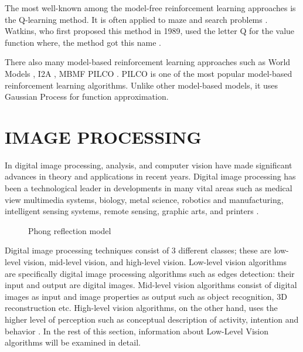 The most well-known among the model-free reinforcement learning approaches is the Q-learning method. It is often applied to maze and search problems \cite{tijsma2016comparing, guo2004new, whitehead1991complexity}. Watkins, who first proposed this method in 1989, used the letter Q for the value function where, the method got this name \cite{watkins1989learning}.

There also many model-based reinforcement learning approaches such as World Models \cite{ha2018world}, I2A \cite{racaniere2017imagination}, MBMF \cite{bansal2017mbmf} PILCO \cite{deisenroth2011pilco}. PILCO is one of the most popular model-based reinforcement learning algorithms. Unlike other model-based models, it uses Gaussian Process for function approximation.

\section{IMAGE PROCESSING}

In digital image processing, analysis, and computer vision have made significant advances in theory and applications in recent years. Digital image processing has been a technological leader in developments in many vital areas such as medical view multimedia systems, biology, metal science, robotics and manufacturing, intelligent sensing systems, remote sensing, graphic arts, and printers \cite{pitas2000digital}.

\begin{figure}[htbp]
\centering
{}
\caption{Phong reflection model \cite{kurihara2012shading}}
\label{fig:PhongReflectionModel}
\end{figure}


Digital image processing techniques consist of 3 different classes; these are low-level vision, mid-level vision, and high-level vision. Low-level vision algorithms are specifically digital image processing algorithms such as edges detection: their input and output are digital images. Mid-level vision algorithms consist of digital images as input and image properties as output such as object recognition, 3D reconstruction etc. High-level vision algorithms, on the other hand, uses the higher level of perception such as conceptual description of activity, intention and behavior \cite{pitas2000digital, gonzalez2002digital}. In the rest of this section, information about Low-Level Vision algorithms will be examined in detail.

